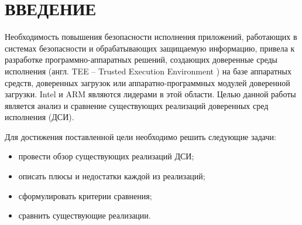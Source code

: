 \section*{ВВЕДЕНИЕ}

Необходимость повышения безопасности исполнения приложений, работающих в системах безопасности и обрабатывающих защищаемую информацию, привела к разработке программно-аппаратных решений, создающих доверенные среды исполнения (англ. TEE -- Trusted Execution Environment \cite{tee}) на базе аппаратных средств, доверенных загрузок или аппаратно-программных модулей доверенной загрузки. Intel \cite{intel} и ARM \cite{arm} являются лидерами в этой области. Целью данной работы является анализ и сравнение существующих реализаций доверенных сред исполнения (ДСИ).

Для достижения поставленной цели необходимо решить следующие задачи:

\begin{itemize}
	\item провести обзор существующих реализаций ДСИ;
	\item описать плюсы и недостатки каждой из реализаций;
	\item сформулировать критерии сравнения;
	\item сравнить существующие реализации.
\end{itemize}

\pagebreak
